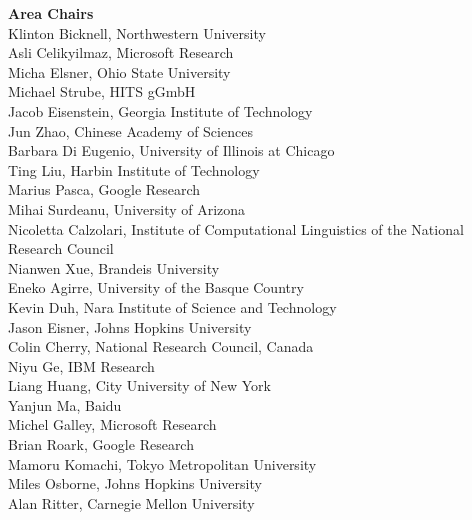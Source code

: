{\bf Area Chairs} \\
Klinton Bicknell, Northwestern University  \\
Asli Celikyilmaz, Microsoft Research  \\
Micha Elsner, Ohio State University  \\
Michael Strube, HITS gGmbH  \\
Jacob Eisenstein, Georgia Institute of Technology  \\
Jun Zhao, Chinese Academy of Sciences  \\
Barbara Di Eugenio, University of Illinois at Chicago  \\
Ting Liu, Harbin Institute of Technology  \\
Marius Pasca, Google Research  \\
Mihai Surdeanu, University of Arizona \\
Nicoletta Calzolari, Institute of Computational Linguistics of the National Research Council  \\
Nianwen Xue, Brandeis University  \\
Eneko Agirre, University of the Basque Country  \\
Kevin Duh, Nara Institute of Science and Technology  \\
Jason Eisner, Johns Hopkins University  \\
Colin Cherry, National Research Council, Canada  \\
Niyu Ge, IBM Research  \\
Liang Huang, City University of New York  \\
Yanjun Ma, Baidu  \\
Michel Galley, Microsoft Research  \\
Brian Roark, Google Research  \\
Mamoru Komachi, Tokyo Metropolitan University  \\
Miles Osborne, Johns Hopkins University  \\
Alan Ritter, Carnegie Mellon University  \\
